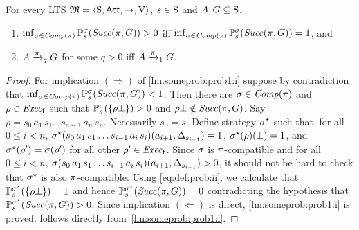\begin{lemma}\label{lm:someprob:prob1}
  For every LTS $\model = \tup{\S,\Act,\ra,\V}$, $s\in\S$ and
  $A,G\subseteq\S$,
  \begin{enumerate}
  \item\label{lm:someprob:prob1:i}%
    $\inf_{\strat\in\Comp(\plan)}\Prob^\strat_s(\Succ(\plan,G))>0$ iff\newline
    $\inf_{\strat\in\Comp(\plan)}\Prob^\strat_s(\Succ(\plan,G))=1$, and
  \item\label{lm:someprob:prob1:ii}%
    $A\reach{\plan}_q G$ for some $q>0$ iff $A\reach{\plan}_1 G$.
  \end{enumerate}
\end{lemma}
%
\begin{proof}
  For implication $(\Rightarrow)$ of \cref{lm:someprob:prob1:i}
  suppose by contradiction that
  $\inf_{\strat\in\Comp(\plan)}\Prob^\strat_s(\Succ(\plan,G))<1$.
  Then there are $\strat\in\Comp(\plan)$ and $\rho\in\execf$ such that
  $\Prob^\strat_s(\{\rho\complete\})>0$ and
  $\rho\complete\notin\Succ(\plan,G)$.
  Say $\rho=s_0\, a_1\, s_1\ldots s_{n-1}\, a_n\, s_n$.  Necessarily
  $s_0=s$.
  Define strategy $\strat^\star$ such that, for all $0\leq i<n$,
  $\strat^\star(s_0\, a_1\, s_1\ldots s_{i-1}\, a_i\, s_i)(a_{i+1},\Dirac_{s_{i+1}})=1$,
  $\strat^\star(\rho)(\complete)=1$, and
  $\strat^\star(\rho')=\strat(\rho')$ for all other $\rho'\in\execf$.
  Since $\strat$ is $\plan$-compatible and  for all ${0\leq i<n}$,
  $\strat(s_0\, a_1\, s_1\ldots s_{i-1}\, a_i\, s_i)(a_{i+1},\Dirac_{s_{i+1}})>0$,
  it should not be hard to check that $\strat^\star$ is also
  $\plan$-compatible.
  Using \cref{eq:def:prob:ii}, we calculate that
  $\Prob^{\strat^\star}_s(\{\rho\complete\})=1$ and hence
  $\Prob^{\strat^\star}_s(\Succ(\plan,G))=0$ contradicting the
  hypothesis that $\Prob^{\strat^\star}_s(\Succ(\plan,G))>0$.
  Since implication $(\Leftarrow)$ is direct,
  \cref{lm:someprob:prob1:i} is proved.
%
   follows directly from~\cref{lm:someprob:prob1:i}.
\end{proof}

